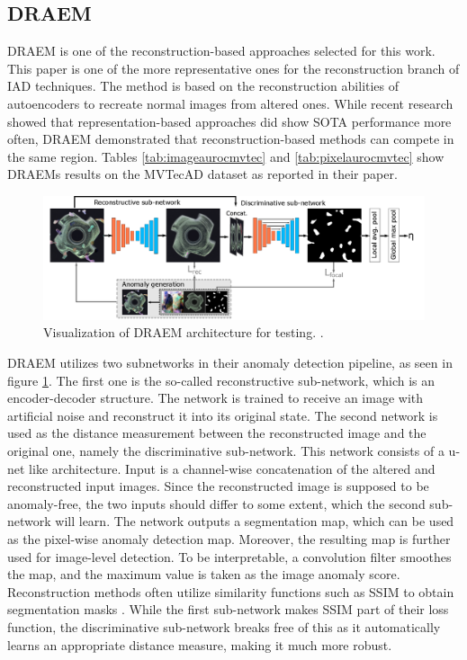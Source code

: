 \subsection{DRAEM}
\label{subsec:DRAEM}

DRAEM \cite{Zavrtanik_2021DRAEM} is one of the reconstruction-based approaches selected for this work. This paper is one of the more representative ones for the reconstruction branch of 
IAD techniques. The method is based on the reconstruction abilities of autoencoders to recreate normal images from altered ones. While recent research showed that representation-based approaches did 
show SOTA performance more often, DRAEM demonstrated that reconstruction-based methods can compete in the same region. Tables \ref{tab:imageaurocmvtec} and 
\ref{tab:pixelaurocmvtec} show DRAEMs results on the MVTecAD dataset as reported 
in their paper.\newline

\begin{figure}[H]
 \centering
\includegraphics[width=\textwidth]{figures/DRAEM_pipeline.png}
 \caption{Visualization of DRAEM architecture for testing. \cite{Zavrtanik_2021DRAEM}.}
 \label{fig:draempipeline}
\end{figure}

DRAEM utilizes two subnetworks in their anomaly detection pipeline, as seen in figure \ref{fig:draempipeline}. The first one is the so-called reconstructive sub-network, which is an encoder-decoder structure. The network is trained 
to receive an image with artificial noise and reconstruct it into its original state. The second network is used as the distance measurement between the reconstructed image and the original one, 
namely the discriminative sub-network. This network consists of a u-net \cite{Ronneberger_2015UNET} like architecture. Input is a channel-wise concatenation of the altered and reconstructed 
input images. Since the reconstructed image is supposed to be anomaly-free, the two inputs should differ to some extent, which the second sub-network will learn. The network outputs a segmentation map, 
which can be used as the pixel-wise anomaly detection map. Moreover, the resulting map is further used for image-level detection. To be interpretable, a convolution filter smoothes the map, and the maximum value is taken as the image anomaly score. Reconstruction methods often utilize similarity functions such as SSIM \cite{Wang_2004SSIM} to obtain segmentation masks \cite{Zavrtanik_2021DRAEM} 
\cite{liu2024deep}. While the first 
sub-network makes SSIM part of their loss function, the discriminative sub-network breaks free of this as it automatically learns an appropriate distance measure, making it much more robust.

